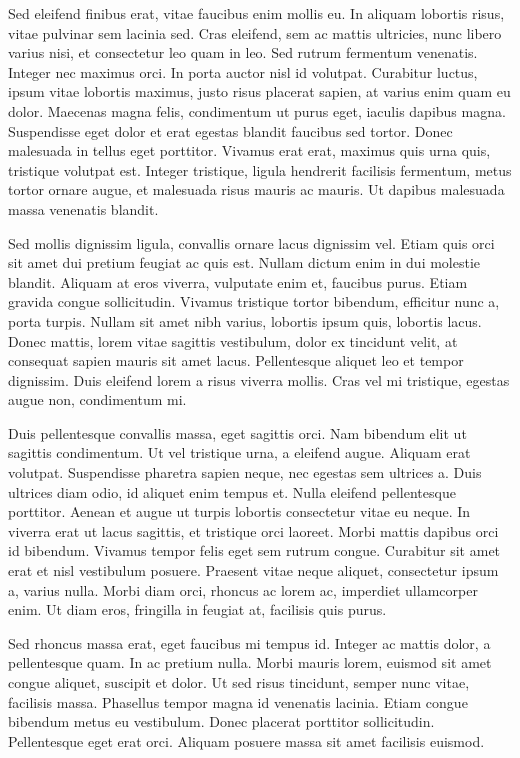 \documentclass[a4paper, 12pt]{article}
\begin{document}
	Sed eleifend finibus erat, vitae faucibus enim mollis eu. In aliquam lobortis risus, vitae pulvinar sem lacinia sed. Cras eleifend, sem ac mattis ultricies, nunc libero varius nisi, et consectetur leo quam in leo. Sed rutrum fermentum venenatis. Integer nec maximus orci. In porta auctor nisl id volutpat. Curabitur luctus, ipsum vitae lobortis maximus, justo risus placerat sapien, at varius enim quam eu dolor. Maecenas magna felis, condimentum ut purus eget, iaculis dapibus magna. Suspendisse eget dolor et erat egestas blandit faucibus sed tortor. Donec malesuada in tellus eget porttitor. Vivamus erat erat, maximus quis urna quis, tristique volutpat est. Integer tristique, ligula hendrerit facilisis fermentum, metus tortor ornare augue, et malesuada risus mauris ac mauris. Ut dapibus malesuada massa venenatis blandit.
	
	Sed mollis dignissim ligula, convallis ornare lacus dignissim vel. Etiam quis orci sit amet dui pretium feugiat ac quis est. Nullam dictum enim in dui molestie blandit. Aliquam at eros viverra, vulputate enim et, faucibus purus. Etiam gravida congue sollicitudin. Vivamus tristique tortor bibendum, efficitur nunc a, porta turpis. Nullam sit amet nibh varius, lobortis ipsum quis, lobortis lacus. Donec mattis, lorem vitae sagittis vestibulum, dolor ex tincidunt velit, at consequat sapien mauris sit amet lacus. Pellentesque aliquet leo et tempor dignissim. Duis eleifend lorem a risus viverra mollis. Cras vel mi tristique, egestas augue non, condimentum mi.
	
	Duis pellentesque convallis massa, eget sagittis orci. Nam bibendum elit ut sagittis condimentum. Ut vel tristique urna, a eleifend augue. Aliquam erat volutpat. Suspendisse pharetra sapien neque, nec egestas sem ultrices a. Duis ultrices diam odio, id aliquet enim tempus et. Nulla eleifend pellentesque porttitor. Aenean et augue ut turpis lobortis consectetur vitae eu neque. In viverra erat ut lacus sagittis, et tristique orci laoreet. Morbi mattis dapibus orci id bibendum. Vivamus tempor felis eget sem rutrum congue. Curabitur sit amet erat et nisl vestibulum posuere. Praesent vitae neque aliquet, consectetur ipsum a, varius nulla. Morbi diam orci, rhoncus ac lorem ac, imperdiet ullamcorper enim. Ut diam eros, fringilla in feugiat at, facilisis quis purus.
	
	Sed rhoncus massa erat, eget faucibus mi tempus id. Integer ac mattis dolor, a pellentesque quam. In ac pretium nulla. Morbi mauris lorem, euismod sit amet congue aliquet, suscipit et dolor. Ut sed risus tincidunt, semper nunc vitae, facilisis massa. Phasellus tempor magna id venenatis lacinia. Etiam congue bibendum metus eu vestibulum. Donec placerat porttitor sollicitudin. Pellentesque eget erat orci. Aliquam posuere massa sit amet facilisis euismod.
	
\end{document}
